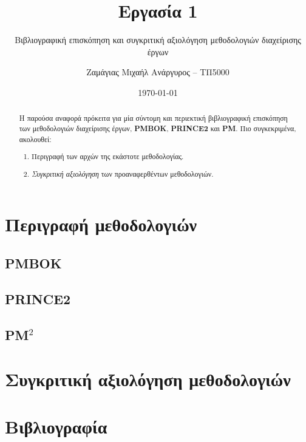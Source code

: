 \documentclass[12pt]{turabian-researchpaper}
\title{Εργασία 1}
\subtitle{Βιβλιογραφική επισκόπηση και συγκριτική αξιολόγηση μεθοδολογιών διαχείρισης έργων}
\author{Ζαμάγιας Μιχαήλ Ανάργυρος -- ΤΠ5000}
\date{\today}
\begin{document}
\begin{titlepage}
    \maketitle
\end{titlepage}

\begin{abstract}
    Η παρούσα αναφορά πρόκειτα για μία σύντομη και περιεκτική βιβλιογραφική επισκόπηση των μεθοδολογιών διαχείρισης έργων, \textbf{PMBOK}, \textbf{PRINCE2} και \textbf{PM}.
    Πιο συγκεκριμένα, ακολουθεί:
    \begin{enumerate}
        \item Περιγραφή των αρχών της εκάστοτε μεθοδολογίας.
        \item \textit{Συγκριτική αξιολόγηση} των προαναφερθέντων μεθοδολογιών.
    \end{enumerate}
\end{abstract}

\tableofcontents

\newpage

\section{Περιγραφή μεθοδολογιών}
\subsection{PMBOK}

\subsection{PRINCE2}

\subsection{PM\texorpdfstring{$^2$}{}}

\section{Συγκριτική αξιολόγηση μεθοδολογιών}

\section{Βιβλιογραφία}

\printbibliography
\end{document}
